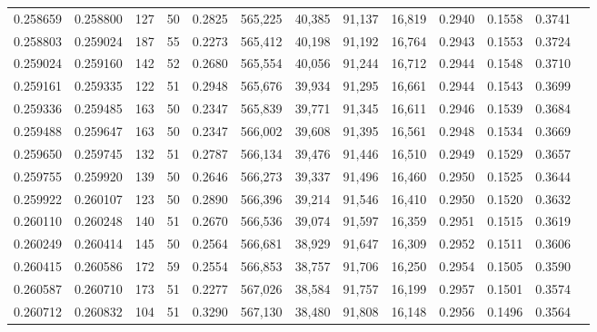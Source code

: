 \begin{tabular}{rrrrrrrrrrrrr}
0.258659 & 0.258800 &   127 &  50 &                                     0.2825 & 565,225 &  40,385 &  91,137 &  16,819 & 0.2940 & 0.1558 & 0.3741 \\
0.258803 & 0.259024 &   187 &  55 &                                     0.2273 & 565,412 &  40,198 &  91,192 &  16,764 & 0.2943 & 0.1553 & 0.3724 \\
0.259024 & 0.259160 &   142 &  52 &                                     0.2680 & 565,554 &  40,056 &  91,244 &  16,712 & 0.2944 & 0.1548 & 0.3710 \\
0.259161 & 0.259335 &   122 &  51 &                                     0.2948 & 565,676 &  39,934 &  91,295 &  16,661 & 0.2944 & 0.1543 & 0.3699 \\
0.259336 & 0.259485 &   163 &  50 &                                     0.2347 & 565,839 &  39,771 &  91,345 &  16,611 & 0.2946 & 0.1539 & 0.3684 \\
0.259488 & 0.259647 &   163 &  50 &                                     0.2347 & 566,002 &  39,608 &  91,395 &  16,561 & 0.2948 & 0.1534 & 0.3669 \\
0.259650 & 0.259745 &   132 &  51 &                                     0.2787 & 566,134 &  39,476 &  91,446 &  16,510 & 0.2949 & 0.1529 & 0.3657 \\
0.259755 & 0.259920 &   139 &  50 &                                     0.2646 & 566,273 &  39,337 &  91,496 &  16,460 & 0.2950 & 0.1525 & 0.3644 \\
0.259922 & 0.260107 &   123 &  50 &                                     0.2890 & 566,396 &  39,214 &  91,546 &  16,410 & 0.2950 & 0.1520 & 0.3632 \\
0.260110 & 0.260248 &   140 &  51 &                                     0.2670 & 566,536 &  39,074 &  91,597 &  16,359 & 0.2951 & 0.1515 & 0.3619 \\
0.260249 & 0.260414 &   145 &  50 &                                     0.2564 & 566,681 &  38,929 &  91,647 &  16,309 & 0.2952 & 0.1511 & 0.3606 \\
0.260415 & 0.260586 &   172 &  59 &                                     0.2554 & 566,853 &  38,757 &  91,706 &  16,250 & 0.2954 & 0.1505 & 0.3590 \\
0.260587 & 0.260710 &   173 &  51 &                                     0.2277 & 567,026 &  38,584 &  91,757 &  16,199 & 0.2957 & 0.1501 & 0.3574 \\
0.260712 & 0.260832 &   104 &  51 &                                     0.3290 & 567,130 &  38,480 &  91,808 &  16,148 & 0.2956 & 0.1496 & 0.3564 \\

\end{tabular}
